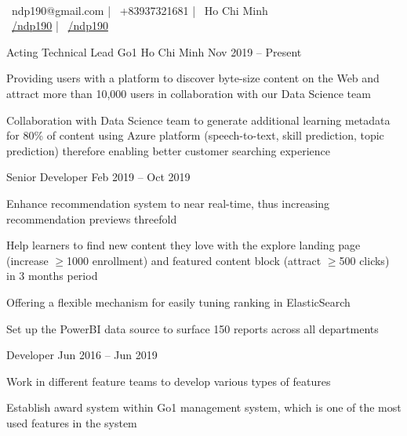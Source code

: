 \documentclass[]{awesome-cv}
\begin{document}
    
\begin{center}
	  \\
	\vspace{2mm}
	{\faEnvelope\ ndp190@gmail.com} | {\faMobile\ +83937321681} | {\faMapMarker\ Ho Chi Minh} \\
	{\faLinkedinSquare\ \href{https://www.linkedin.com/in/ndp190}{/ndp190}} | {\faGithubSquare\ \href{https://github.com/ndp190}{/ndp190}}
\end{center}

\begin{cventries}
	\cventry
	{Acting Technical Lead}
	{Go1}
	{Ho Chi Minh}
	{Nov 2019 – Present}
	{\begin{cvitems}
		\item {Providing users with a platform to discover byte-size content on the Web and attract more than 10,000 users in collaboration with our Data Science team}
		\item {Collaboration with Data Science team to generate additional learning metadata for 80\% of content using Azure platform (speech-to-text, skill prediction, topic prediction) therefore enabling better customer searching experience}
		\end{cvitems}}
	\cventry
	{Senior Developer}
	{}
	{}
	{Feb 2019 – Oct 2019}
	{\begin{cvitems}
		\item {Enhance recommendation system to near real-time, thus increasing recommendation previews threefold}
		\item {Help learners to find new content they love with the explore landing page (increase $\geq$1000 enrollment) and featured content block (attract $\geq$500 clicks) in 3 months period}
		\item {Offering a flexible mechanism for easily tuning ranking in ElasticSearch}
		\item {Set up the PowerBI data source to surface 150 reports across all departments}
		\end{cvitems}}
	\cventry
	{Developer}
	{}
	{}
	{Jun 2016 – Jun 2019}
	{\begin{cvitems}
		\item {Work in different feature teams to develop various types of features}
		\item {Establish award system within Go1 management system, which is one of the most used features in the system}

\end{cvitems}}
\end{cventries}
\end{document}
